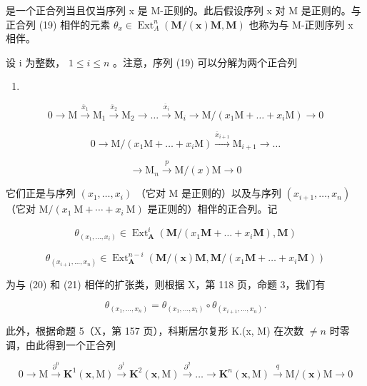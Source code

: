 是一个正合列当且仅当序列 x 是 M-正则的。此后假设序列 x 对 M 是正则的。与正合列 (19) 相伴的元素 \(\theta_{x} \in \operatorname{Ext}_{A}^{n}(\mathbf{M}/(\mathbf{x})\mathbf{M}, \mathbf{M})\) 也称为与 M-正则序列 x 相伴。

设 i 为整数， \(1 \leqslant i \leqslant n\) 。注意，序列 (19) 可以分解为两个正合列

\begin{enumerate}
\def\labelenumi{(\arabic{enumi})}
\setcounter{enumi}{19}
\tightlist
\item
\end{enumerate}

\[
0 \longrightarrow \mathrm{M} \xrightarrow {\overline {{x}} _ {1}} \mathrm{M} _ {1} \xrightarrow {\overline {{x}} _ {2}} \mathrm{M} _ {2} \longrightarrow \dots \xrightarrow {\overline {{x}} _ {i}} \mathrm{M} _ {i} \longrightarrow \mathrm{M} / (x _ {1} \mathrm{M} + \dots + x _ {i} \mathrm{M}) \longrightarrow 0\tag{21}
\]

\[
0 \longrightarrow \mathrm{M} / (x _ {1} \mathrm{M} + \dots + x _ {i} \mathrm{M}) \xrightarrow {\overline {{x}} _ {i + 1}} \mathrm{M} _ {i + 1} \longrightarrow \dots
\]

\[
\longrightarrow \mathrm{M} _ {n} \stackrel {p} {\longrightarrow} \mathrm{M} / (x) \mathrm{M} \longrightarrow 0
\]

它们正是与序列 \((x_{1}, \ldots, x_{i})\) （它对 M 是正则的）以及与序列 \((x_{i+1}, \ldots, x_{n})\) （它对 \(\mathrm{M}/(x_{1} \mathrm{~M} + \cdots + x_{i} \mathrm{~M})\) 是正则的）相伴的正合列。记

\[
\theta_ {(x _ {1}, \dots , x _ {i})} \in \operatorname{Ext} _ {\mathbf {A}} ^ {i} (\mathbf {M} / (x _ {1} \mathbf {M} + \dots + x _ {i} \mathbf {M}), \mathbf {M})
\]

\[
\theta_ {(x _ {i + 1}, \dots , x _ {n})} \in \operatorname{Ext} _ {\mathbf {A}} ^ {n - i} (\mathbf {M} / (\boldsymbol {x}) \mathbf {M}, \mathbf {M} / (x _ {1} \mathbf {M} + \dots + x _ {i} \mathbf {M}))
\]

为与 (20) 和 (21) 相伴的扩张类，则根据 X，第 118 页，命题 3，我们有

\[
\theta_ {(x _ {1}, \dots , x _ {n})} = \theta_ {(x _ {1}, \dots , x _ {i})} \circ \theta_ {(x _ {i + 1}, \dots , x _ {n})}.\tag{22}
\]

此外，根据命题 5（X，第 157 页），科斯居尔复形 K.(x, M) 在次数 \(\neq n\) 时零调，由此得到一个正合列

\[
0 \longrightarrow \mathrm{M} \xrightarrow {\partial^ {0}} \mathbf {K} ^ {1} (\boldsymbol {x}, \mathrm{M}) \xrightarrow {\partial^ {1}} \mathbf {K} ^ {2} (\boldsymbol {x}, \mathrm{M}) \xrightarrow {\partial^ {2}} \dots \longrightarrow \mathbf {K} ^ {n} (\boldsymbol {x}, \mathrm{M}) \xrightarrow {q} \mathrm{M} / (\boldsymbol {x}) \mathrm{M} \longrightarrow 0\tag{23}
\]

